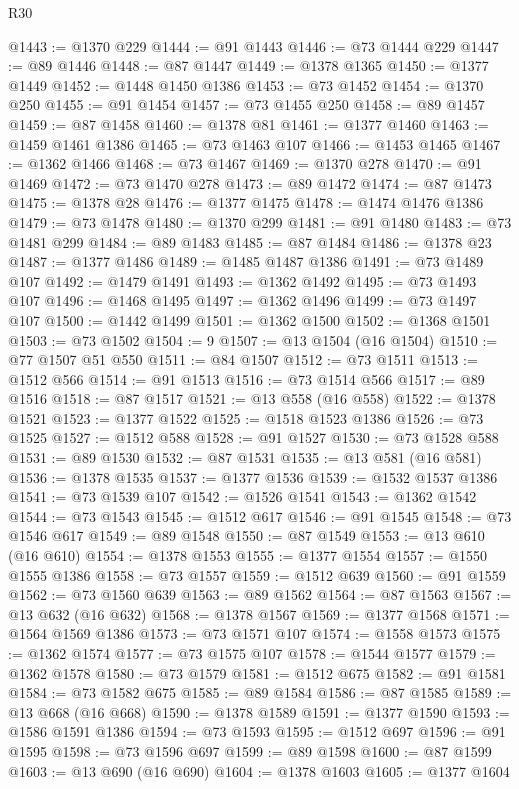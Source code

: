 \begin{lexlean}{R30}
\begin{coremodule}
@1443 := @1370 @229
@1444 := @91 @1443
@1446 := @73 @1444 @229
@1447 := @89 @1446
@1448 := @87 @1447
@1449 := @1378 @1365
@1450 := @1377 @1449
@1452 := @1448 @1450 @1386
@1453 := @73 @1452
@1454 := @1370 @250
@1455 := @91 @1454
@1457 := @73 @1455 @250
@1458 := @89 @1457
@1459 := @87 @1458
@1460 := @1378 @81
@1461 := @1377 @1460
@1463 := @1459 @1461 @1386
@1465 := @73 @1463 @107
@1466 := @1453 @1465
@1467 := @1362 @1466
@1468 := @73 @1467
@1469 := @1370 @278
@1470 := @91 @1469
@1472 := @73 @1470 @278
@1473 := @89 @1472
@1474 := @87 @1473
@1475 := @1378 @28
@1476 := @1377 @1475
@1478 := @1474 @1476 @1386
@1479 := @73 @1478
@1480 := @1370 @299
@1481 := @91 @1480
@1483 := @73 @1481 @299
@1484 := @89 @1483
@1485 := @87 @1484
@1486 := @1378 @23
@1487 := @1377 @1486
@1489 := @1485 @1487 @1386
@1491 := @73 @1489 @107
@1492 := @1479 @1491
@1493 := @1362 @1492
@1495 := @73 @1493 @107
@1496 := @1468 @1495
@1497 := @1362 @1496
@1499 := @73 @1497 @107
@1500 := @1442 @1499
@1501 := @1362 @1500
@1502 := @1368 @1501
@1503 := @73 @1502
@1504 := 9
@1507 := @13 @1504 (@16 @1504)
@1510 := @77 @1507 @51 @550
@1511 := @84 @1507
@1512 := @73 @1511
@1513 := @1512 @566
@1514 := @91 @1513
@1516 := @73 @1514 @566
@1517 := @89 @1516
@1518 := @87 @1517
@1521 := @13 @558 (@16 @558)
@1522 := @1378 @1521
@1523 := @1377 @1522
@1525 := @1518 @1523 @1386
@1526 := @73 @1525
@1527 := @1512 @588
@1528 := @91 @1527
@1530 := @73 @1528 @588
@1531 := @89 @1530
@1532 := @87 @1531
@1535 := @13 @581 (@16 @581)
@1536 := @1378 @1535
@1537 := @1377 @1536
@1539 := @1532 @1537 @1386
@1541 := @73 @1539 @107
@1542 := @1526 @1541
@1543 := @1362 @1542
@1544 := @73 @1543
@1545 := @1512 @617
@1546 := @91 @1545
@1548 := @73 @1546 @617
@1549 := @89 @1548
@1550 := @87 @1549
@1553 := @13 @610 (@16 @610)
@1554 := @1378 @1553
@1555 := @1377 @1554
@1557 := @1550 @1555 @1386
@1558 := @73 @1557
@1559 := @1512 @639
@1560 := @91 @1559
@1562 := @73 @1560 @639
@1563 := @89 @1562
@1564 := @87 @1563
@1567 := @13 @632 (@16 @632)
@1568 := @1378 @1567
@1569 := @1377 @1568
@1571 := @1564 @1569 @1386
@1573 := @73 @1571 @107
@1574 := @1558 @1573
@1575 := @1362 @1574
@1577 := @73 @1575 @107
@1578 := @1544 @1577
@1579 := @1362 @1578
@1580 := @73 @1579
@1581 := @1512 @675
@1582 := @91 @1581
@1584 := @73 @1582 @675
@1585 := @89 @1584
@1586 := @87 @1585
@1589 := @13 @668 (@16 @668)
@1590 := @1378 @1589
@1591 := @1377 @1590
@1593 := @1586 @1591 @1386
@1594 := @73 @1593
@1595 := @1512 @697
@1596 := @91 @1595
@1598 := @73 @1596 @697
@1599 := @89 @1598
@1600 := @87 @1599
@1603 := @13 @690 (@16 @690)
@1604 := @1378 @1603
@1605 := @1377 @1604

\end{coremodule}
\end{lexlean}
